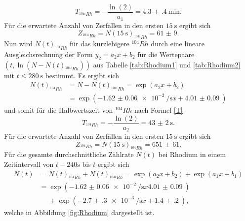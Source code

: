 \begin{displaymath}
	T_{^{104i}Rh} = -\frac{\ln(2)}{a_1}=\SI{4.3(4)}{\minute}\text{.}
\end{displaymath}
Für die erwartete Anzahl von Zerfällen in den ersten $\SI{15}{\second}$ ergibt sich
\begin{displaymath}
	Z_{^{104i}Rh} = N(\SI{15}{\second})_{^{104i}Rh}=\num{61(9)}\text{.}
\end{displaymath}
Nun wird $N(t)_{^{104}Rh}$ für das kurzlebigere $^{104} Rh$ durch eine lineare Ausgleichsrechnung der Form $y_2=a_2 x+b_2$ für die Wertepaare $(t,\ln(N-N(t)_{^{104i}Rh}))$ aus Tabelle \ref{tab:Rhodium1} und \ref{tab:Rhodium2}  mit $t\le \SI{280}{\second}$ bestimmt.
Es ergibt sich
\begin{align*}
N(t)_{^{104}Rh} &= N-N(t)_{^{104i}Rh} = \exp\left(a_2 x + b_2\right) \\
 &= \exp\left(-\SI{1.62(6)e-2}{\per\second} x + \SI{4.01(9)}{}\right)
\end{align*}
und somit für die Halbwertszeit von $^{104} Rh$ nach Formel \eqref{T}
\begin{displaymath}
T_{^{104}Rh} = -\frac{\ln(2)}{a_2}=\SI{43(2)}{\second}\text{.}
\end{displaymath}
Für die erwartete Anzahl von Zerfällen in den ersten $\SI{15}{\second}$ ergibt sich
\begin{displaymath}
Z_{^{104}Rh} = N(\SI{15}{\second})_{^{104}Rh}=\num{651(61)}\text{.}
\end{displaymath}
Für die gesamte durchschnittliche Zählrate $N(t)$ bei Rhodium in einem Zeitintervall von $t-240\si{\second}$ bis $t$ ergibt sich
\begin{align*}
N(t)&=N(t)_{^{104}Rh}+N(t)_{^{104i}Rh} =  \exp\left(a_2 x + b_2\right)+\exp\left(a_1 x + b_1\right) \\
&= \exp\left(-\SI{1.62(6)e-2}{\per\second} x \SI{4.01(9)}{}\right) \\
&\phantom{=}+\exp\left(-\SI{2.7(3)e-3}{\per\second} x + \SI{1.4(2)}{}\right)\text{,}
\end{align*}
welche in Abbildung \ref{fig:Rhodium} dargestellt ist.


